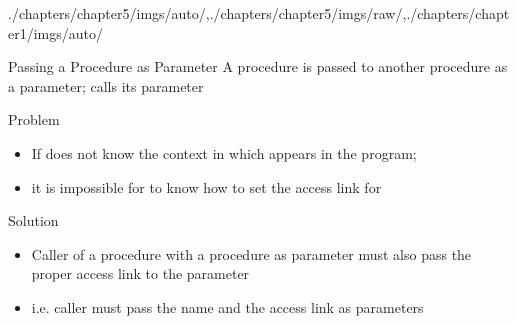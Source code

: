 \begin{graphicspathcontext}{{./chapters/chapter5/imgs/auto/},{./chapters/chapter5/imgs/raw/},{./chapters/chapter1/imgs/auto/}}
\begin{bibunit}[apalike]
\begin{frame}{Passing a Procedure as Parameter}
	A procedure  is passed to another procedure  as a parameter;  calls its parameter \\[.5cm]
	\begin{alertblock}{Problem}
		\begin{itemize}
			\item If  does not know the context in which  appears in the program;
			\item it is impossible for  to know how to set the access link for 
		\end{itemize}
	\end{alertblock}
	\vspace{.5cm}
	\begin{block}{Solution}
		\begin{itemize}
			\item Caller of a procedure with a procedure as parameter must also pass the proper access link to the parameter
			\item i.e. caller must pass the name and the access link as parameters
		\end{itemize}
	\end{block}
\end{frame}


\end{bibunit}
\end{graphicspathcontext}
